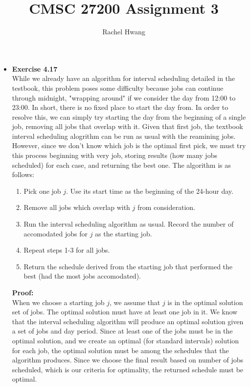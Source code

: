 \documentclass[a4paper]{article}
\title{CMSC 27200 Assignment 3}
\author{Rachel Hwang}
\begin{document}
\maketitle

\begin{itemize}


\item{\textbf{Exercise 4.17}} \\
While we already have an algorithm for interval scheduling detailed in the testbook, this problem poses some difficulty because jobs can continue through midnight, "wrapping around" if we consider the day from 12:00 to 23:00. In short, there is no fixed place to start the day from. In order to resolve this, we can simply try starting the day from the beginning of a single job, removing all jobs that overlap with it. Given that first job, the textbook interval scheduling alogrithm can be run as usual with the reamining jobs. However, since we don't know which job is the optimal first pick, we must try this process beginning with very job, storing results (how many jobs scheduled) for each case, and returning the best one.
The algorithm is as follows:
\begin{enumerate}
\item Pick one job $j$. Use its start time as the beginning of the 24-hour day.
\item Remove all jobs which overlap with $j$ from consideration.
\item Run the interval scheduling algorithm as usual. Record the number of accomodated jobs for $j$ as the starting job.
\item Repeat steps 1-3 for all jobs.
\item Return the schedule derived from the starting job that performed the best (had the most jobs accomodated).
\end{enumerate}
\textbf{Proof:} \\
When we choose a starting job $j$, we assume that $j$ is in the optimal solution set of jobs. The optimal solution must have at least one job in it. We know that the interval scheduling algorithm will produce an optimal solution given a set of jobs and day period. Since at least one of the jobs must be in the optimal solution, and we create an optimal (for standard intervals) solution for each job, the optimal solution must be among the schedules that the algorithm produces. Since we choose the final result based on number of jobs scheduled, which is our criteria for optimality, the returned schedule must be optimal.


\end{itemize}
\end{document}
